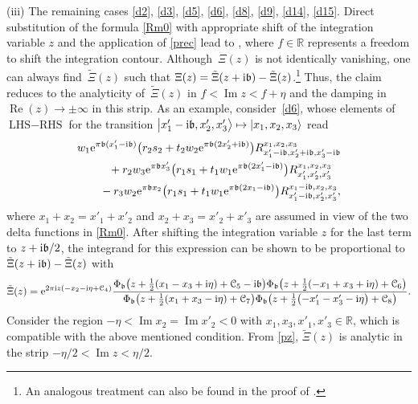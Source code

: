 \documentclass[pdftex]{sigma}
\newcommand{\R}{{\mathbb R}}
\newcommand{\bb}{{\mathfrak b}}
\newcommand{\e}{{\mathrm e}}
\numberwithin{equation}{section}
\begin{document}
(iii) The remaining cases \eqref{d2}, \eqref{d3}, \eqref{d5}, \eqref{d6}, \eqref{d8}, \eqref{d9}, \eqref{d14}, \eqref{d15}.
Direct substitution of the formula \eqref{Rm0} with
appropriate shift of the integration variable $z$ and the application
of \eqref{prec} lead to
\smash{$\mathrm{LHS}-\mathrm{RHS} = \int_{\R + {\rm i} f} {\rm d}z \Xi(z)$},
where $f \in \R$ represents a freedom to shift the integration contour.
Although~$\Xi(z)$ is not identically vanishing, one can always find~${\tilde \Xi}(z)$ such that
$\Xi(z) = {\tilde \Xi}(z+{\rm i} \bb)-{\tilde \Xi}(z)$.\footnote{An analogous
treatment can also be found in the proof of \cite[Theorem~3.18]{K22}.}
%
Thus, the claim reduces to the analyticity of~${\tilde \Xi}(z)$ in
$f< \operatorname{Im} z < f+\eta$ and the
damping in
$\operatorname{Re}(z) \rightarrow \pm \infty$ in this strip.
%
As an example, consider~\eqref{d6}, whose elements of $\text{LHS}-\text{RHS}$ for the transition
$\bigl|x'_1 - {\rm i} \bb,x'_2,x'_3\bigr\rangle \mapsto |x_1,x_2,x_3\rangle$ read
\begin{gather}
w_1 \e^{\pi \bb (x'_1-{\rm i} \bb)}\bigl(r_2s_2+t_2w_2\e^{\pi \bb(2x'_2+{\rm i}\bb)}\bigr)
 R^{x_1,x_2,x_3}_{x'_1-{\rm i} \bb, x'_2+{\rm i}\bb, x'_3-{\rm i}\bb} \nonumber
 \\
 \qquad{}+ r_2w_3 \e^{\pi \bb x'_3}\bigl(r_1s_1+t_1w_1\e^{\pi \bb(2x'_1-{\rm i}\bb)}\bigr)
 R^{x_1,x_2,x_3}_{x'_1,x'_2,x'_3}\nonumber
 \\
 \qquad{}- r_3w_2\e^{\pi \bb x_2}\bigl(r_1s_1+t_1w_1\e^{\pi \bb(2x_1-{\rm i}\bb)}\bigr)
 R^{x_1-{\rm i}\bb,x_2,x_3}_{x'_1-{\rm i}\bb,x'_2,x'_3},
 \label{dd6}
\end{gather}
where $x_1+x_2=x'_1+x'_2$ and $x_2+x_3=x'_2+x'_3$ are assumed in view of the two delta functions
in \eqref{Rm0}.
After shifting the integration variable $z$ for the last term to
$z+{\rm i} \bb/2$, the integrand for this expression can be shown to be
proportional to ${\tilde \Xi}(z+{\rm i} \bb)-{\tilde \Xi}(z)$ with
\[
{\tilde \Xi}(z) =
\e^{2\pi {\rm i}z(-x_2-{\rm i}\eta+{\mathcal C}_4)}
\frac{\Phi_\bb\bigl(z+\frac{1}{2}(x_1-x_3+{\rm i}\eta)+{\mathcal C}_5-{\rm i} \bb\bigr)
\Phi_\bb\bigl(z+\frac{1}{2}(-x_1+x_3+{\rm i}\eta)+{\mathcal C}_6\bigr)}
{\Phi_\bb\bigl(z+\frac{1}{2}(x_1+x_3-{\rm i}\eta)+{\mathcal C}_7\bigr)
\Phi_\bb\bigl(z+\frac{1}{2}\bigl(-x'_1-x'_3-{\rm i}\eta\bigr)+{\mathcal C}_8\bigr)}.
\]
Consider the region $-\eta < \operatorname{Im} x_2 = \operatorname{Im}x'_2<0$
with $x_1,x_3, x'_1, x'_3 \in \R$, which is compatible with the above mentioned condition.
From \eqref{pz}, ${\tilde \Xi}(z)$ is analytic in the strip ${-\eta/2 < \operatorname{Im}z < \eta/2}$.
\end{document}
